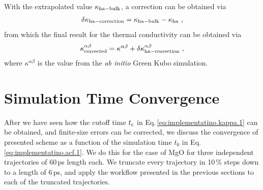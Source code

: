 With the extrapolated value $\kappa_{\rm ha-bulk}$, a correction can be obtained via
\begin{align}
	\delta \kappa_{\rm ha-correction} 
		= \kappa_{\rm ha-bulk} - \kappa_{\rm ha}~,
	\label{eq:imp.K.correction}
\end{align}
from which the final result for the thermal conductivity can be obtained via
\begin{align}
	\kappa^{\alpha \beta}_{\rm corrected}
		 = \kappa^{\alpha \beta} + \delta \kappa^{\alpha \beta}_{\rm ha-correction}~,
	\label{eq:imp.K.corrected}
\end{align}
where $\kappa^{\alpha \beta}$ is the value from the \emph{ab initio} Green Kubo simulation.

\section{Simulation Time Convergence}
After we have seen how the cutoff time $t_{\rm c}$ in Eq.\,\eqref{eq:implementatino.kappa.1} can be obtained, and finite-size errors can be corrected, we discuss the convergence of presented scheme as a function of the simulation time $t_0$ in Eq.\,\eqref{eq:implementatino.acf.1}. We do this for the case of MgO for three independent trajectories of 60\,ps length each. We truncate every trajectory in 10\,\% steps down to a length of 6\,ps, and apply the workflow presented in the previous sections to each of the truncated trajectories. 
